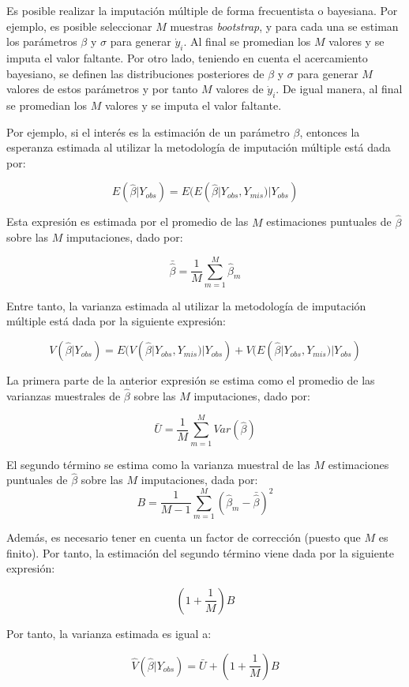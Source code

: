 \documentclass[
  10pt,
  spanish,
]{book}
\begin{document}
Es posible realizar la imputación múltiple de forma frecuentista o bayesiana. Por ejemplo, es posible seleccionar \(M\) muestras \emph{bootstrap}, y para cada una se estiman los parámetros \(\beta\) y \(\sigma\) para generar \(\dot{y}_i\). Al final se promedian los \(M\) valores y se imputa el valor faltante. Por otro lado, teniendo en cuenta el acercamiento bayesiano, se definen las distribuciones posteriores de \(\beta\) y \(\sigma\) para generar \(M\) valores de estos parámetros y por tanto \(M\) valores de \(\dot{y}_i\). De igual manera, al final se promedian los \(M\) valores y se imputa el valor faltante.

Por ejemplo, si el interés es la estimación de un parámetro \(\beta\), entonces la esperanza estimada al utilizar la metodología de imputación múltiple está dada por:

\[
E(\hat{\beta} | Y_{obs}) = E(E(\hat{\beta} | Y_{obs}, Y_{mis}) | Y_{obs})
\]

Esta expresión es estimada por el promedio de las \(M\) estimaciones puntuales de \(\hat{\beta}\) sobre las \(M\) imputaciones, dado por:

\[
\bar{\hat{\beta}} = \frac{1}{M} \sum_{m = 1} ^ M \hat{\beta}_m
\]

Entre tanto, la varianza estimada al utilizar la metodología de imputación múltiple está dada por la siguiente expresión:

\[
V(\hat{\beta} | Y_{obs}) = E(V(\hat{\beta} | Y_{obs}, Y_{mis}) | Y_{obs}) +
V(E(\hat{\beta} | Y_{obs}, Y_{mis}) | Y_{obs}) 
\]

La primera parte de la anterior expresión se estima como el promedio de las varianzas muestrales de \(\hat{\beta}\) sobre las \(M\) imputaciones, dado por:

\[
\bar{U} = \frac{1}{M} \sum_{m = 1} ^ M Var(\hat{\beta})
\]

El segundo término se estima como la varianza muestral de las \(M\) estimaciones puntuales de \(\hat{\beta}\) sobre las \(M\) imputaciones, dada por:
\[
B = \frac{1}{M-1} \sum_{m = 1} ^ M (\hat{\beta}_m - \bar{\hat{\beta}})^2
\]

Además, es necesario tener en cuenta un factor de corrección (puesto que \(M\) es finito). Por tanto, la estimación del segundo término viene dada por la siguiente expresión:

\[
\left(1 + \frac{1}{M}\right) B
\]

Por tanto, la varianza estimada es igual a:

\[
\hat{V}(\hat{\beta} | Y_{obs}) = \bar{U} + \left(1 + \frac{1}{M}\right) B
\]
\end{document}
